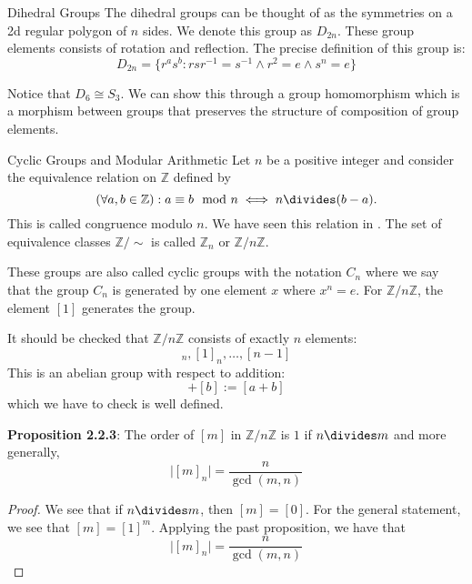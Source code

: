 \documentclass{report}
\begin{document}
\begin{definition}[\label{def:2.2.2}]{Dihedral Groups}
    The dihedral groups can be thought of as the symmetries on a 2d regular polygon of $n$ sides. We denote this group as $D_{2n}$. These group elements consists of rotation and reflection. The precise definition of this group is:
        \begin{equation*}
            D_{2n} = \{r^{a}s^{b} : rsr^{-1} = s^{-1} \land r^{2} = e \land s^{n} = e\}
        \end{equation*}
\end{definition}

Notice that $D_{6} \cong S_{3}$. We can show this through a group homomorphism which is a morphism between groups that preserves the structure of composition of group elements.

\begin{definition}[\label{def:2.2.3}]{Cyclic Groups and Modular Arithmetic}
    Let $n$ be a positive integer and consider the equivalence relation on $\mathbb{Z}$ defined by
        \begin{equation*}
            (\forall a, b \in \mathbb{Z}) : a \equiv b \mod{n} \iff n \divides (b - a).
        \end{equation*}
    This is called congruence modulo $n$. We have seen this relation in . The set of equivalence classes $\mathbb{Z} / \sim $ is called $\mathbb{Z}_{n}$ or $\mathbb{Z} / n\mathbb{Z}$.

    These groups are also called cyclic groups with the notation $C_{n}$ where we say that the group $C_{n}$ is generated by one element $x$ where $x^{n} = e$. For $\mathbb{Z} / n\mathbb{Z}$, the element $[1]$ generates the group.
\end{definition}

It should be checked that $\mathbb{Z}/n\mathbb{Z}$ consists of exactly $n$ elements:
    \begin{equation*}
        [0]_{n}, [1]_{n}, \ldots, [n - 1]
    \end{equation*}
This is an abelian group with respect to addition:
    \begin{equation*}
        [a] + [b] := [a + b]
    \end{equation*}
which we have to check is well defined.

\textbf{Proposition 2.2.3}: The order of $[m]$ in $\mathbb{Z}/ n\mathbb{Z}$ is $1$ if $n \divides m$ and more generally, 
    \begin{equation*}
        \lvert [m]_{n} \rvert = \dfrac{n}{\gcd(m, n)}
    \end{equation*}
\begin{proof}
    We see that if $n \divides m$, then $[m] = [0]$. For the general statement, we see that $[m] = [1]^{m}$. Applying the past proposition, we have that 
        \begin{equation*}
            \lvert [m]_{n} \rvert = \frac{n}{\gcd(m, n)}
        \end{equation*}
\end{proof}
\end{document}
